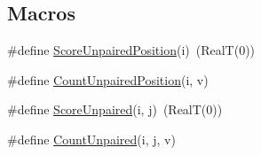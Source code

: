 \subsection*{Macros}
\begin{DoxyCompactItemize}
\item 
\#define \hyperlink{_duplex_engine_8ipp_a666eda33d91985654878e47d2ae946f9}{Score\+Unpaired\+Position}(i)~(Real\+T(0))
\item 
\#define \hyperlink{_duplex_engine_8ipp_ad1a5e921b0e92db551f427174caf4a17}{Count\+Unpaired\+Position}(i, v)
\item 
\#define \hyperlink{_duplex_engine_8ipp_a60bcc697793ce883a656595cf9732373}{Score\+Unpaired}(i, j)~(Real\+T(0))
\item 
\#define \hyperlink{_duplex_engine_8ipp_a1056d51ce4855d6c744d64cb4414889e}{Count\+Unpaired}(i, j, v)
\end{DoxyCompactItemize}



